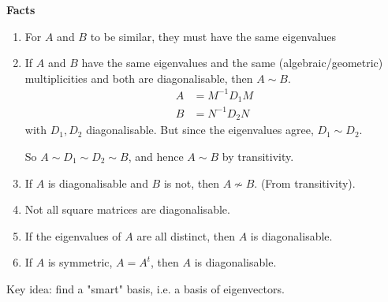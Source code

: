 \documentclass[10pt, a4paper]{article}
\begin{document}
\textbf{Facts}
\begin{proposition}
    \begin{enumerate}[label = (\alph*)]
        \item For $A$ and $B$ to be similar,
        they must have the same eigenvalues
    
        \item If $A$ and $B$ have the same eigenvalues and the same
        (algebraic/geometric)
        multiplicities and both are diagonalisable,
        then $A \sim B$.
        \begin{align*}
            A &= M ^ {-1}D_1M \\
            B &= N ^ {-1}D_2N
        \end{align*}
        with $D_1, D_2$ diagonalisable.
        But since the eigenvalues agree,
        $D_1 \sim D_2$.
    
        So $A \sim D_1 \sim D_2 \sim B$,
        and hence $A \sim B$ by transitivity.
    
        \item If $A$ is diagonalisable and $B$ is not,
        then $A \nsim B$.
        (From transitivity).
    
        \item Not all square matrices are diagonalisable.
    
        \item If the eigenvalues of $A$ are all distinct,
        then $A$ is diagonalisable.
    
        \item If $A$ is symmetric,
        $A = A ^ t$,
        then $A$ is diagonalisable.
    \end{enumerate}
\end{proposition}

Key idea:
find a "smart" basis,
i.e. a basis of eigenvectors.
\end{document}
